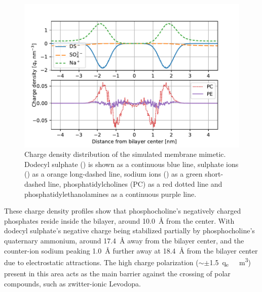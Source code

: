 \documentclass[3p,preprint,review]{elsarticle}
\begin{document}
	\begin{figure}[htb]
		\centering
		\includegraphics[width=\columnwidth]{charge_density}
		\caption{Charge density distribution of the simulated membrane mimetic. Dodecyl sulphate () is shown as a continuous blue line, sulphate ions () as a orange long-dashed line, sodium ions () as a green short-dashed line, phosphatidylcholines (PC) as a red dotted line and phosphatidylethanolamines as a continuous purple line.}
		\label{fig:charge_density}
	\end{figure}
	
	These charge density profiles show that phosphocholine's negatively charged
	phosphates reside inside the bilayer, around \SI{10.0}{\angstrom} from the
	center. With dodecyl sulphate's negative charge being stabilized partially by
	phosphocholine's quaternary ammonium, around \SI{17.4}{\angstrom} away from the
	bilayer center, and the counter-ion sodium peaking \SI{1.0}{\angstrom} further
	away at \SI{18.4}{\angstrom} from the bilayer
	center due to electrostatic attractions. The
	high charge polarization ($\sim\pm$\SI{1.5}{q_e \per\nano\cubic\meter}) present
	in
	this area acts as the main barrier against the crossing of polar compounds,
	such as
	zwitter-ionic Levodopa.\\
	
\end{document}
